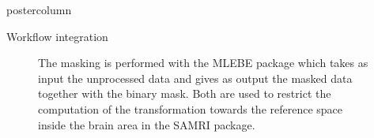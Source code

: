 \begin{frame}
\begin{columns}
\begin{column}{.42\textwidth}
\begin{beamercolorbox}[center]{postercolumn}
\begin{minipage}{.98\textwidth}
{\begin{myblock}{Workflow integration}
                                \begin{figure}
                                    \centering
                                    \caption{The masking is performed with the \textcolor{lg}{MLEBE} \cite{mlebe} package which takes as input the unprocessed data and gives as output the masked data together with the binary mask. Both are used to restrict the computation of the transformation towards the reference space inside the brain area in the \textcolor{lg}{SAMRI} \cite{irsabi} package.}
                                \end{figure}
                            \end{myblock}\vfill

}
\end{minipage}
\end{beamercolorbox}
\end{column}
\end{columns}
\end{frame}
